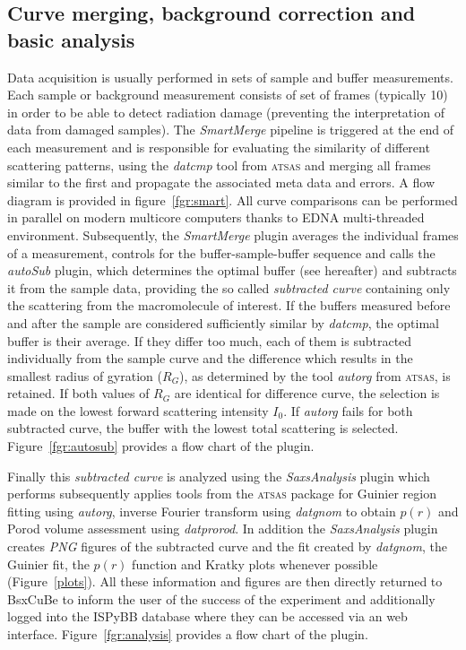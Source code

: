 \documentclass[preprint,pdf]{iucr}              %
\begin{document}
\subsection{Curve merging, background correction and basic analysis}
\label{SM}
Data acquisition is usually performed  in sets of sample and buffer measurements.
Each sample or background measurement consists of set of frames
(typically 10) in order to be able to detect radiation damage
(preventing the interpretation of data from damaged samples).
The \textit{SmartMerge} pipeline is triggered at the end of each measurement
and is responsible for evaluating the similarity of different scattering
patterns, using the \textit{datcmp} tool from \textsc{atsas} and merging all frames
similar to the first and propagate the associated meta data and errors.
A flow diagram is provided in figure~\ref{fgr:smart}.
All curve comparisons can be performed in parallel on modern multicore
computers thanks to EDNA multi-threaded environment.
Subsequently, the \textit{SmartMerge} plugin averages the individual frames
of a measurement, controls for the buffer-sample-buffer sequence and
 calls the \textit{autoSub} plugin, which determines the optimal buffer
(see hereafter) and subtracts it from the sample data,  providing the so called
\textit{subtracted curve} containing only the scattering from the macromolecule
of interest.
If the buffers measured before and after the sample are considered sufficiently
similar by \textit{datcmp}, the optimal buffer is their average.
If they differ too much, each of them is subtracted individually from the
sample curve and the difference which results in  the smallest radius of gyration ($R_{G}$),
as determined by the tool \textit{autorg} from \textsc{atsas}, is retained.
If both values of $R_{G}$ are identical for difference curve, the selection is made on the lowest forward scattering intensity $I_{0}$.
If \textit{autorg} fails for both subtracted curve, the buffer with the lowest total scattering is selected.
Figure~\ref{fgr:autosub} provides a flow chart of the plugin.

Finally this \textit{subtracted curve} is analyzed using the
\textit{SaxsAnalysis} plugin which performs subsequently applies tools from the \textsc{atsas} package for Guinier region fitting
using \textit{autorg}, inverse Fourier transform using \textit{datgnom} to obtain
$p(r)$ and Porod volume assessment using \textit{datprorod}.
In addition the \textit{SaxsAnalysis} plugin creates \textit{PNG} figures of
the subtracted curve and the fit created by \textit{datgnom}, the Guinier fit,
the $p(r)$ function and Kratky plots whenever possible (Figure~\ref{plots}).
All these information and figures are then directly returned to BsxCuBe to inform the user
of the success of the experiment and additionally logged into the ISPyBB
database \cite{ISPYBB} where they can be accessed via an web interface.
Figure~\ref{fgr:analysis} provides a flow chart of the plugin.
\end{document}
